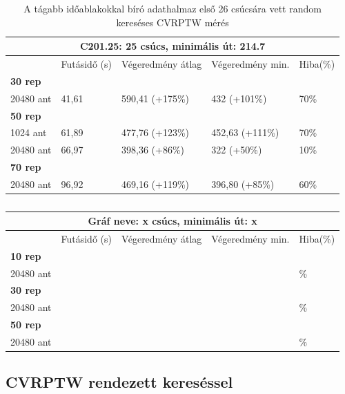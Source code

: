 \begin{table}[ht!]
	\centering
	\begin{tabular}{|p{1.75cm}||p{2cm}|p{3.25cm}|p{3.25cm}|p{1.5cm}|}
		\hline
		\multicolumn{5}{|c|}{C201.25: 25 csúcs, minimális út: 214.7} \\
		\hline
		& Futásidő (s) & Végeredmény átlag & Végeredmény min. & Hiba(\%) \\
		\hline
		\textbf{30 rep} &  &  &  &  \\
		20480 ant & 41,61 & 590,41 (+175\%) & 432 (+101\%) & 70\%  \\
		\hline
		\textbf{50 rep} &  &  &  &  \\
		1024 ant & 61,89 & 477,76 (+123\%) & 452,63 (+111\%) & 70\% \\
		20480 ant & 66,97 & 398,36 (+86\%) & 322 (+50\%) & 10\% \\
		\hline
		\textbf{70 rep} &  &  &  &  \\
		20480 ant & 96,92 & 469,16 (+119\%) & 396,80 (+85\%) & 60\% \\
		\hline
	\end{tabular}
	\caption{A tágabb időablakokkal bíró adathalmaz első 26 csúcsára vett random kereséses CVRPTW mérés}
	\label{table:VRTPW_25_2}
\end{table}

\begin{table}[ht!]
	\centering
	\begin{tabular}{|p{1.75cm}||p{2cm}|p{3.25cm}|p{3.25cm}|p{1.5cm}|}
		\hline
		\multicolumn{5}{|c|}{Gráf neve: x csúcs, minimális út: x} \\
		\hline
		& Futásidő (s) & Végeredmény átlag & Végeredmény min. & Hiba(\%) \\
		\hline
		\textbf{10 rep} &  &  &  & \\
		20480 ant &  &  &  &  \% \\
		\hline
		\textbf{30 rep} &  &  &  & \\
		20480 ant &  &  &  &  \% \\
		\hline
		\textbf{50 rep} &  &  &  &  \\
		20480 ant &  &  &  &  \% \\
		\hline
	\end{tabular}
	\caption{}
	\label{table:VRTPW_empty}
\end{table}

\subsection{CVRPTW rendezett kereséssel}

